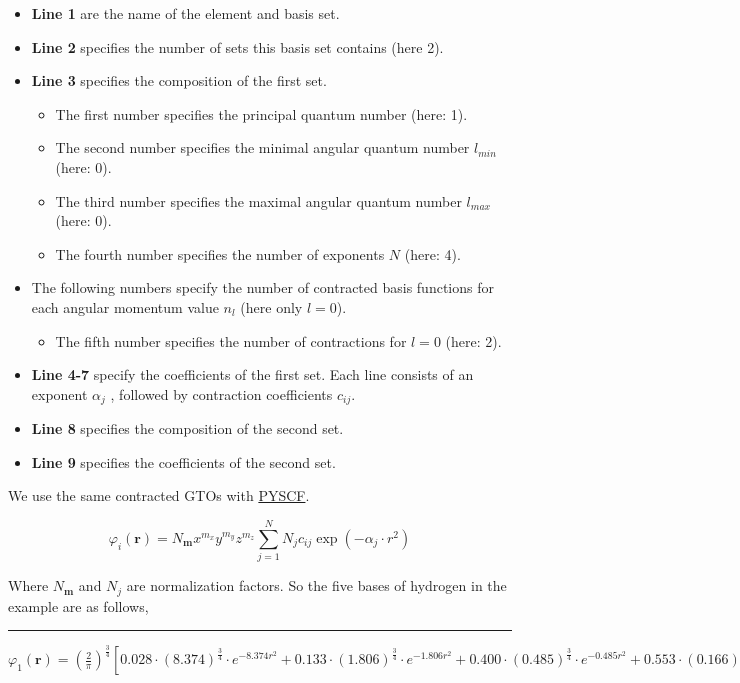 \documentclass{article}
\begin{document}
        \begin{itemize}
            \item[] \textbf{Line 1} are the name of the element and basis set.
            \item[] \textbf{Line 2} specifies the number of sets this basis set contains (here 2).
            \item[] \textbf{Line 3} specifies the composition of the first set.
            \begin{itemize}
                \item[] The first number specifies the principal quantum number (here: 1).
                \item[] The second number specifies the minimal angular quantum number $l_{min}$ (here: 0).
                \item[] The third number specifies the maximal angular quantum number $l_{max}$ (here: 0).
                \item[] The fourth number specifies the number of exponents $N$ (here: 4).
            \end{itemize}
            \item[] The following numbers specify the number of contracted basis functions for each angular momentum value $n_l$ (here only $l=0$).
            \begin{itemize}
                \item[] The fifth number specifies the number of contractions for $l=0$ (here: 2).
            \end{itemize}
            \item[] \textbf{Line 4-7} specify the coefficients of the first set. Each line consists of an exponent $\alpha_j$
            , followed by contraction coefficients $c_{ij}$.
            \item[] \textbf{Line 8} specifies the composition of the second set.
            \item[] \textbf{Line 9} specifies the coefficients of the second set.
        \end{itemize}

        We use the same contracted GTOs with \href{https://pyscf.org/}{PYSCF}.

        \begin{equation}
            \varphi_i(\textbf{r}) = N_{\textbf{m}}x^{m_x}y^{m_y}z^{m_z}\sum_{j=1}^NN_{j}c_{ij}\exp\left(-\alpha_{j}\cdot r^2\right)
        \end{equation}

        Where $N_{\textbf{m}}$ and $N_{j}$ are normalization factors.
        So the five bases of hydrogen in the example are as follows,
        ~\\
        \hrule
        $ \varphi_1(\textbf{r}) = \left(\frac{2}{\pi}\right)^{\frac{3}{4}}\left[
            0.028\cdot(8.374)^{\frac{3}{4}}\cdot e^{-8.374r^2}+
            0.133\cdot(1.806)^{\frac{3}{4}}\cdot e^{-1.806r^2}+
            0.400\cdot(0.485)^{\frac{3}{4}}\cdot e^{-0.485r^2}+
            0.553\cdot(0.166)^{\frac{3}{4}}\cdot e^{-0.166r^2}\right] $
 
\end{document}
